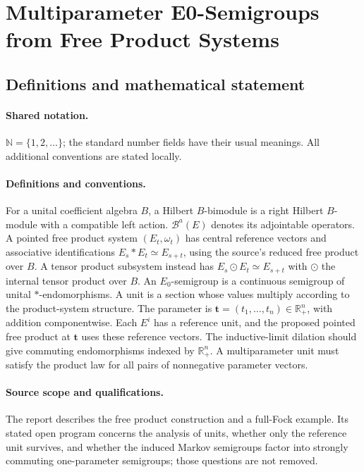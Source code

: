 \documentclass[11pt]{article}
\begin{document}
\section{Multiparameter E0-Semigroups from Free Product Systems}\label{statement}

\subsection{Definitions and mathematical statement}

\paragraph{Shared notation.}$\mathbb N=\{1,2,\ldots\}$; the standard number fields have their usual meanings. All additional conventions are stated locally.


\paragraph{Definitions and conventions.} For a unital coefficient algebra $B$, a Hilbert $B$-bimodule is a right Hilbert $B$-module with a compatible left action. $\mathcal B^a(E)$ denotes its adjointable operators. A pointed free product system $(E_t,\omega_t)$ has central reference vectors and associative identifications $E_s*E_t\simeq E_{s+t}$, using the source's reduced free product over $B$. A tensor product subsystem instead has $E_s\odot E_t\simeq E_{s+t}$ with $\odot$ the internal tensor product over $B$. An $E_0$-semigroup is a continuous semigroup of unital $*$-endomorphisms. A unit is a section whose values multiply according to the product-system structure. The parameter is $\mathbf t=(t_1,\ldots,t_n)\in\mathbb R_+^n$, with addition componentwise. Each $E^i$ has a reference unit, and the proposed pointed free product at $\mathbf t$ uses these reference vectors. The inductive-limit dilation should give commuting endomorphisms indexed by $\mathbb R_+^n$. A multiparameter unit must satisfy the product law for all pairs of nonnegative parameter vectors.

\paragraph{Source scope and qualifications.} The report describes the free product construction and a full-Fock example. Its stated open program concerns the analysis of units, whether only the reference unit survives, and whether the induced Markov semigroups factor into strongly commuting one-parameter semigroups; those questions are not removed.
\end{document}
